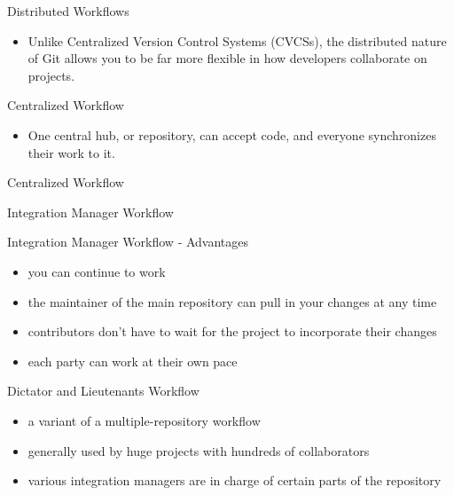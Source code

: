 \documentclass{beamer}
\begin{document}
\begin{frame}{Distributed Workflows}
  \begin{itemize}
  \item
    Unlike Centralized Version Control Systems (CVCSs), the distributed nature of Git allows you to be far more flexible in how developers collaborate on projects.
  \end{itemize}
\end{frame}

\begin{frame}{Centralized Workflow}
  \begin{itemize}
  \item
    One central hub, or repository, can accept code, and everyone synchronizes their work to it.
  \end{itemize}
\end{frame}

\begin{frame}{Centralized Workflow}
    \centering
    \hfill\vfill
\end{frame}

\begin{frame}{Integration Manager Workflow}
    \centering
    \hfill\vfill
\end{frame}

\begin{frame}{Integration Manager Workflow - Advantages}
  \begin{itemize}
  \item
    you can continue to work
  \item
    the maintainer of the main repository can pull in your changes at any time
  \item
    contributors don't have to wait for the project to incorporate their changes
  \item
    each party can work at their own pace
  \end{itemize}
\end{frame}

\begin{frame}{Dictator and Lieutenants Workflow}
  \begin{itemize}
  \item
    a variant of a multiple-repository workflow
  \item
    generally used by huge projects with hundreds of collaborators
  \item
    various integration managers are in charge of certain parts of the repository
  \end{itemize}
\end{frame}
\end{document}
